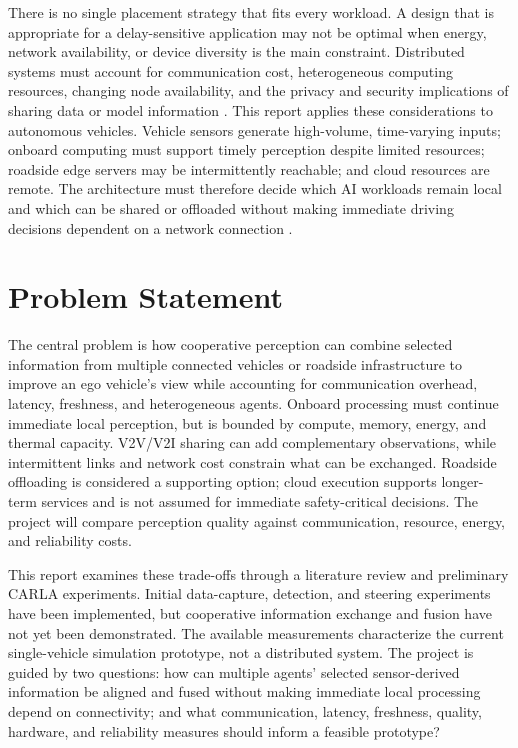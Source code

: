 \documentclass[12pt,a4paper,oneside]{report}
\begin{document}
There is no single placement strategy that fits every workload. A design
that is appropriate for a delay-sensitive application may not be optimal
when energy, network availability, or device diversity is the main
constraint. Distributed systems must account for communication cost,
heterogeneous computing resources, changing node availability, and the
privacy and security implications of sharing data or model information
\cite{deng2020,hu2023}. This report applies these considerations to
autonomous vehicles. Vehicle sensors generate high-volume, time-varying
inputs; onboard computing must support timely perception despite limited
resources; roadside edge servers may be intermittently reachable; and cloud
resources are remote. The architecture must therefore decide which AI
workloads remain local and which can be shared or offloaded without making
immediate driving decisions dependent on a network connection
\cite{biswas2023,deng2020}.

\section{Problem Statement}

The central problem is how cooperative perception can combine selected
information from multiple connected vehicles or roadside infrastructure to
improve an ego vehicle's view while accounting for communication overhead,
latency, freshness, and heterogeneous agents. Onboard processing must
continue immediate local perception, but is bounded by compute, memory,
energy, and thermal capacity. V2V/V2I sharing can add complementary
observations, while intermittent links and network cost constrain what can
be exchanged. Roadside offloading is considered a supporting option; cloud
execution supports longer-term services and is not assumed for immediate
safety-critical decisions. The project will compare perception quality
against communication, resource, energy, and reliability costs.

This report examines these trade-offs through a literature review and
preliminary CARLA experiments. Initial data-capture, detection, and steering
experiments have been implemented, but cooperative information exchange and
fusion have not yet been demonstrated. The available measurements
characterize the current single-vehicle simulation prototype, not a
distributed system. The project is guided by two questions: how can
multiple agents' selected sensor-derived information be aligned and fused
without making immediate local processing depend on connectivity; and what
communication, latency, freshness, quality, hardware, and reliability
measures should inform a feasible prototype?
\end{document}
